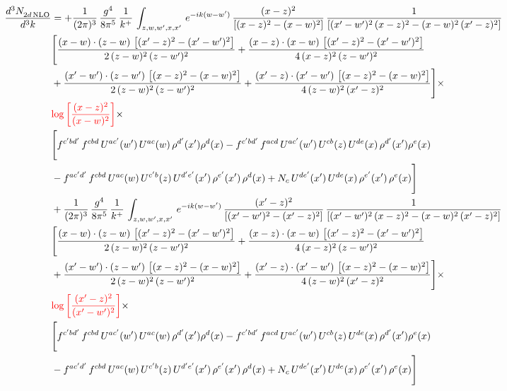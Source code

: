 \documentclass[9pt]{article}
\numberwithin{equation}{section}
\begin{document}
\begin{align}
 \frac{d^{3}N_{2d\,\rm NLO}^{\rm}}{d^{3}k}  & =   +\frac{1}{(2\pi)^{3}}\, \frac{g^{4}}{8\pi^{5}}\,\frac{1}{k^{+}}\,\int_{z,w,w^{\prime},x,x'}\, e^{-ik(w-w^{\prime})}\,\frac{(x-z)^{2}}{\left[(x-z)^{2}-(x-w)^{2}\right]}\,\frac{1}{\left[(x'-w')^{2}\,(x-z)^{2} - (x-w)^{2}\,(x'-z)^{2}\right]}\notag \\ & \Bigg[\frac{(x-w)\cdot (z-w)\, \left[(x'-z)^{2}-(x'-w')^{2}\right]}{2\, (z-w)^{2}\, (z-w')^{2}}  + \frac{(x-z)\cdot (x-w)\,\left[(x'-z)^{2}-(x'-w')^{2}\right] }{4\,(x-z)^{2}\,(z-w')^{2}}\notag \\ & +\frac{(x'-w')\cdot (z-w')\, \left[(x-z)^{2}-(x-w)^{2}\right]}{2\, (z-w)^{2}\, (z-w')^{2}}+ \frac{(x'-z)\cdot (x'-w')\, \left[(x-z)^{2}-(x-w)^{2}\right]}{4\, (z-w)^{2}\,(x'-z)^{2}}\Bigg]\times\,\notag \\ & {\color{red}\log{\left[\frac{(x-z)^{2}}{(x-w)^{2}}\right]}} \times\notag \\ & \Bigg[f^{c'bd'}\,f^{cbd}\, U^{ac'}(w')\,U^{ac}(w)\,\rho^{d'}(x')\rho^{d}(x)- f^{c'bd'}\,f^{acd}\,U^{ac'}(w')\,U^{cb}(z)\,U^{de}(x)\,\rho^{d'}(x')\rho^{e}(x) \notag \\ & -f^{ac'd'}\,f^{cbd}\,U^{ac}(w)\,U^{c'b}(z)\,U^{d'e'}(x')\,\rho^{e'}(x')\,\rho^{d}(x) +N_{c}\,U^{de'}(x')\,U^{de}(x)\,\rho^{e'}(x')\,\rho^{e}(x)\Bigg] \notag \\
& +\frac{1}{(2\pi)^{3}}\, \frac{g^{4}}{8\pi^{5}}\,\frac{1}{k^{+}}\,\int_{z,w,w^{\prime},x,x'}\, e^{-ik(w-w^{\prime})}\,\frac{(x'-z)^{2}}{\left[(x'-w')^{2}-(x'-z)^{2}\right]}\,\frac{1}{\left[(x'-w')^{2}\,(x-z)^{2} - (x-w)^{2}\,(x'-z)^{2}\right]}\notag \\ & \Bigg[\frac{(x-w)\cdot (z-w)\, \left[(x'-z)^{2}-(x'-w')^{2}\right]}{2\, (z-w)^{2}\, (z-w')^{2}}  + \frac{(x-z)\cdot (x-w)\,\left[(x'-z)^{2}-(x'-w')^{2}\right] }{4\,(x-z)^{2}\,(z-w')^{2}}\notag \\ & +\frac{(x'-w')\cdot (z-w')\, \left[(x-z)^{2}-(x-w)^{2}\right]}{2\, (z-w)^{2}\, (z-w')^{2}}+ \frac{(x'-z)\cdot (x'-w')\, \left[(x-z)^{2}-(x-w)^{2}\right]}{4\, (z-w)^{2}\,(x'-z)^{2}}\Bigg]\times\,\notag \\ & {\color{red}\log{\left[\frac{(x'-z)^{2}}{(x'-w')^{2}}\right]}} \times\notag \\ & \Bigg[f^{c'bd'}\,f^{cbd}\, U^{ac'}(w')\,U^{ac}(w)\,\rho^{d'}(x')\rho^{d}(x)- f^{c'bd'}\,f^{acd}\,U^{ac'}(w')\,U^{cb}(z)\,U^{de}(x)\,\rho^{d'}(x')\rho^{e}(x) \notag \\ & -f^{ac'd'}\,f^{cbd}\,U^{ac}(w)\,U^{c'b}(z)\,U^{d'e'}(x')\,\rho^{e'}(x')\,\rho^{d}(x) +N_{c}\,U^{de'}(x')\,U^{de}(x)\,\rho^{e'}(x')\,\rho^{e}(x)\Bigg]
\end{align}
\end{document}
